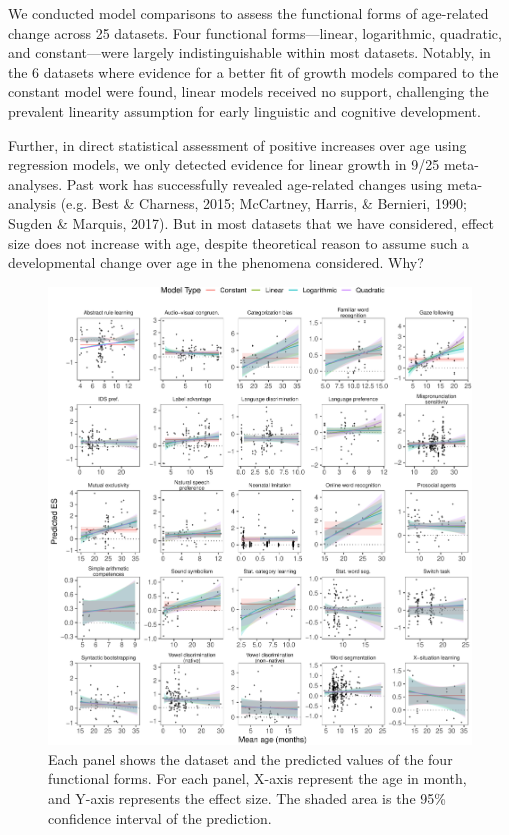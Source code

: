 \documentclass[
  man]{apa6}
\begin{document}
We conducted model comparisons to assess the functional forms of age-related change across 25 datasets. Four functional forms---linear, logarithmic, quadratic, and constant---were largely indistinguishable within most datasets. Notably, in the 6 datasets where evidence for a better fit of growth models compared to the constant model were found, linear models received no support, challenging the prevalent linearity assumption for early linguistic and cognitive development.

Further, in direct statistical assessment of positive increases over age using regression models, we only detected evidence for linear growth in 9/25 meta-analyses. Past work has successfully revealed age-related changes using meta-analysis (e.g. Best \& Charness, 2015; McCartney, Harris, \& Bernieri, 1990; Sugden \& Marquis, 2017). But in most datasets that we have considered, effect size does not increase with age, despite theoretical reason to assume such a developmental change over age in the phenomena considered. Why?

\begin{figure}
\centering
\includegraphics{00_main_files/figure-latex/unnamed-chunk-21-1.pdf}
\caption{\label{fig:unnamed-chunk-21}Each panel shows the dataset and the predicted values of the four functional forms. For each panel, X-axis represent the age in month, and Y-axis represents the effect size. The shaded area is the 95\% confidence interval of the prediction.}
\end{figure}
\end{document}
